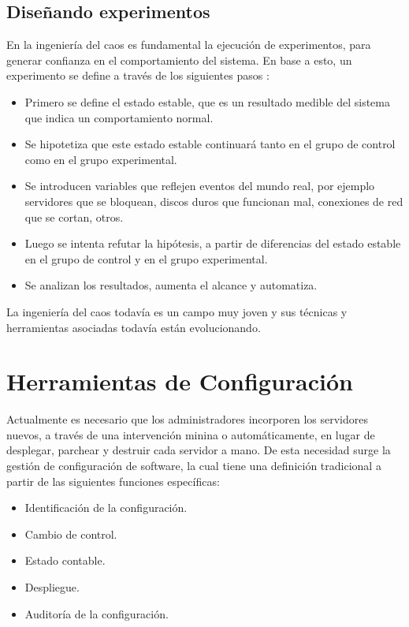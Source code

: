 \subsection{Diseñando experimentos}
\par En la ingeniería del caos es fundamental la ejecución de experimentos, para generar confianza en el comportamiento del sistema. En base a esto, un experimento se define a través de los siguientes pasos \cite{LIB02, LIB06}:
\begin{itemize}
    \item Primero se define el estado estable, que es un resultado medible del sistema que indica un comportamiento normal.
    \item Se hipotetiza que este estado estable continuará tanto en el grupo de control como en el grupo experimental.
    \item Se introducen variables que reflejen eventos del mundo real, por ejemplo servidores que se bloquean, discos duros que funcionan mal, conexiones de red que se cortan, otros.
    \item Luego se intenta refutar la hipótesis, a partir de diferencias del estado estable en el grupo de control y en el grupo experimental.
    \item Se analizan los resultados, aumenta el alcance y automatiza.
\end{itemize}

\par La ingeniería del caos todavía es un campo muy joven y sus técnicas y herramientas asociadas todavía están evolucionando.

\section{Herramientas de Configuración}
\par  Actualmente es necesario que los administradores incorporen los servidores nuevos, a través de una intervención minina o automáticamente, en lugar de desplegar, parchear y destruir cada servidor a mano. De esta necesidad surge la gestión de configuración de software, la cual tiene una definición tradicional a partir de las siguientes funciones específicas:
\begin{itemize}
    \item Identificación de la configuración.
    \item Cambio de control.
    \item Estado contable.
    \item Despliegue.
    \item Auditoría de la configuración.
\end{itemize}

